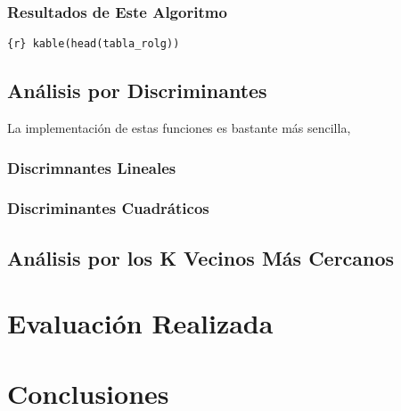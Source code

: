 \documentclass[]{article}
\begin{document}
\hypertarget{resultados-de-este-algoritmo}{%
\subsubsection{Resultados de Este
Algoritmo}\label{resultados-de-este-algoritmo}}

\texttt{\{r\}\ kable(head(tabla\_rolg))}

\hypertarget{analisis-por-discriminantes}{%
\subsection{Análisis por
Discriminantes}\label{analisis-por-discriminantes}}

La implementación de estas funciones es bastante más sencilla,

\hypertarget{discrimnantes-lineales}{%
\subsubsection{Discrimnantes Lineales}\label{discrimnantes-lineales}}

\hypertarget{discriminantes-cuadraticos}{%
\subsubsection{Discriminantes
Cuadráticos}\label{discriminantes-cuadraticos}}

\hypertarget{analisis-por-los-k-vecinos-mas-cercanos}{%
\subsection{Análisis por los K Vecinos Más
Cercanos}\label{analisis-por-los-k-vecinos-mas-cercanos}}

\hypertarget{evaluacion-realizada}{%
\section{Evaluación Realizada}\label{evaluacion-realizada}}

\hypertarget{conclusiones}{%
\section{Conclusiones}\label{conclusiones}}
\end{document}
